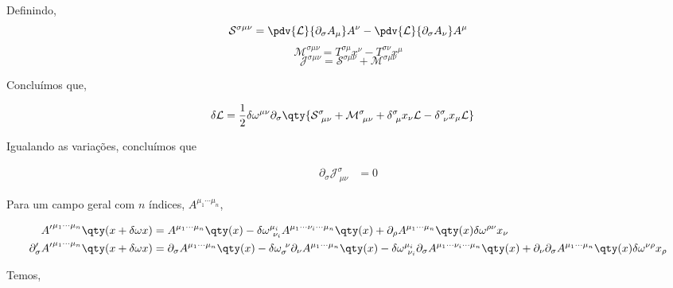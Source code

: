 \documentclass[twoside]{amsart}
\numberwithin{equation}{section}
\begin{document}
\begin{refsection}
Definindo,$$\mathcal S^{\sigma\mu\nu}=\pdv{\mathcal L}{\partial_\sigma A_\mu}A^\nu-\pdv{\mathcal L}{\partial_\sigma A_\nu}A^\mu$$ $$\mathcal M^{\sigma\mu\nu}=T^{\sigma\mu}x^\nu-T^{\sigma\nu}x^\mu$$ $$\mathcal J^{\sigma\mu\nu}=\mathcal S^{\sigma\mu\nu}+\mathcal M^{\sigma\mu\nu}$$

Concluímos que,

\begin{align}
    \delta\mathcal L&=\frac12\delta\omega^{\mu\nu}\partial_\sigma\qty{\mathcal S^{\sigma}_{\ \mu\nu}+\mathcal M^{\sigma}_{\ \mu\nu}+\delta^\sigma_{\ \mu}x_\nu\mathcal L-\delta^\sigma_{\ \nu}x_\mu\mathcal L}
\end{align}

Igualando as variações, concluímos que 

\begin{align}
    \partial_\sigma\mathcal J^{\sigma}_{\ \mu\nu}&=0
\end{align}

Para um campo geral com $n$ índices, $A^{\mu_1\cdots\mu_n}$,

\begin{align}
    {A'}^{\mu_1\cdots\mu_n}\qty(x+\delta \omega x)&=A^{\mu_1\cdots\mu_n}\qty(x)-\delta\omega^{\mu_i}_{\ \nu_i}A^{\mu_1\cdots\nu_i\cdots\mu_n}\qty(x)+\partial_\rho A^{\mu_1\cdots\mu_n}\qty(x)\delta\omega^{\rho \nu}x_\nu\\
    \partial_\sigma'{A'}^{\mu_1\cdots\mu_n}\qty(x+\delta\omega x)&=\partial_\sigma A^{\mu_1\cdots\mu_n}\qty(x)-\delta\omega_{\sigma}^{\ \nu}\partial_\nu A^{\mu_1\cdots\mu_n}\qty(x)-\delta\omega^{\mu_i}_{\ \nu_i}\partial_\sigma A^{\mu_1\cdots\nu_i\cdots\mu_n}\qty(x)+\partial_\nu\partial_\sigma A^{\mu_1\cdots\mu_n}\qty(x)\delta\omega^{\nu\rho}x_\rho
\end{align}

Temos,


\end{refsection}
\end{document}
